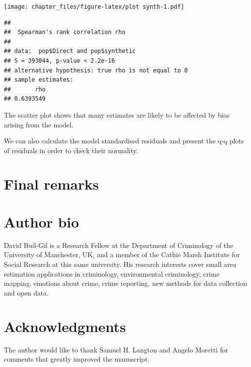 \documentclass[
]{article}
\newenvironment{Shaded}{\begin{snugshade}}{\end{snugshade}}
\newcommand{\CommentTok}[1]{\textcolor[rgb]{0.56,0.35,0.01}{\textit{#1}}}
\newcommand{\DataTypeTok}[1]{\textcolor[rgb]{0.13,0.29,0.53}{#1}}
\newcommand{\KeywordTok}[1]{\textcolor[rgb]{0.13,0.29,0.53}{\textbf{#1}}}
\newcommand{\NormalTok}[1]{#1}
\newcommand{\OperatorTok}[1]{\textcolor[rgb]{0.81,0.36,0.00}{\textbf{#1}}}
\newcommand{\StringTok}[1]{\textcolor[rgb]{0.31,0.60,0.02}{#1}}
\begin{document}
\texttt{[image: chapter\_files/figure-latex/plot synth-1.pdf]}

\begin{Shaded}
\end{Shaded}

\begin{verbatim}
## 
##  Spearman's rank correlation rho
## 
## data:  pop$Direct and pop$synthetic
## S = 393044, p-value < 2.2e-16
## alternative hypothesis: true rho is not equal to 0
## sample estimates:
##       rho 
## 0.6393549
\end{verbatim}

The scatter plot shows that many estimates are likely to be affected by
bias arising from the model.

We can also calculate the model standardised residuals and present the
q-q plots of residuals in order to check their normality.

\hypertarget{final-remarks}{%
\section{Final remarks}\label{final-remarks}}

\hypertarget{author-bio}{%
\section{Author bio}\label{author-bio}}

David Buil-Gil is a Research Fellow at the Department of Criminology of
the University of Manchester, UK, and a member of the Cathie Marsh
Institute for Social Research at this same university. His research
interests cover small area estimation applications in criminology,
environmental criminology, crime mapping, emotions about crime, crime
reporting, new methods for data collection and open data.

\hypertarget{acknowledgments}{%
\section{Acknowledgments}\label{acknowledgments}}

The author would like to thank Samuel H. Langton and Angelo Moretti for
comments that greatly improved the manuscript.
\end{document}
